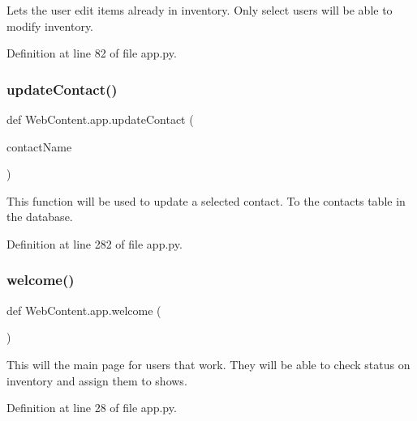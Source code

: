 \begin{DoxyVerb}Lets the user edit items already in inventory.
Only select users will be able to modify inventory.
\end{DoxyVerb}
 

Definition at line 82 of file app.\+py.

\mbox{\label{namespace_web_content_1_1app_a6192c461f4e0e0a2310f43f91f2724ad}} 
\subsubsection{\texorpdfstring{update\+Contact()}{updateContact()}}
{\footnotesize\ttfamily def Web\+Content.\+app.\+update\+Contact (\begin{DoxyParamCaption}\item[{}]{contact\+Name }\end{DoxyParamCaption})}

\begin{DoxyVerb}This function will be used to update a selected contact.
To the contacts table in the database. 
\end{DoxyVerb}
 

Definition at line 282 of file app.\+py.

\mbox{\label{namespace_web_content_1_1app_ac220a4f6d552ae239a9fe5a933eb4c0d}} 
\subsubsection{\texorpdfstring{welcome()}{welcome()}}
{\footnotesize\ttfamily def Web\+Content.\+app.\+welcome (\begin{DoxyParamCaption}{ }\end{DoxyParamCaption})}

\begin{DoxyVerb}This will the main page for users
that work. They will be able to check status on inventory
and assign them to shows.
\end{DoxyVerb}
 

Definition at line 28 of file app.\+py.




